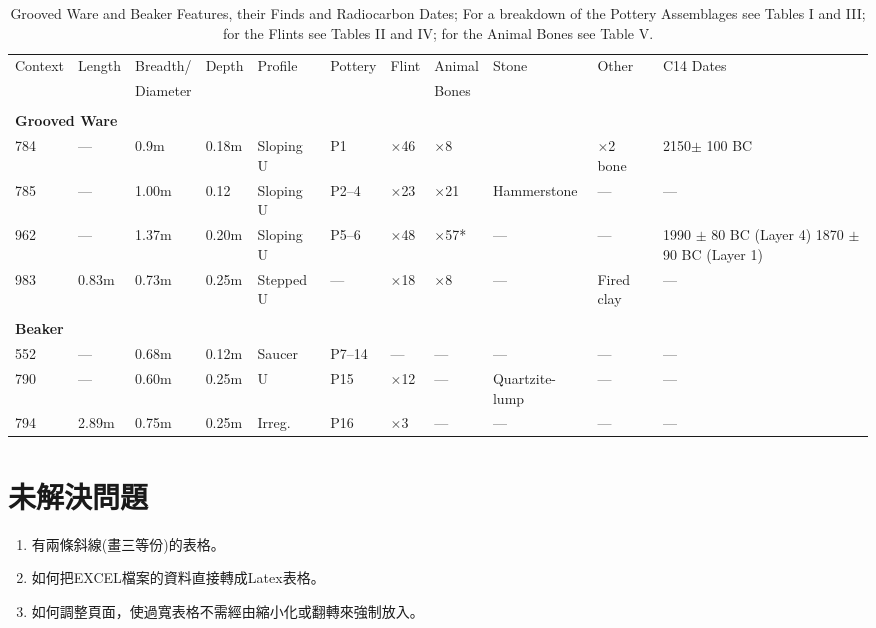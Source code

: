 \documentclass[12pt,a4paper]{report}
\begin{document}
\begin{CJK}{UTF8}{bkai}
\begin{sidewaystable}
\centering
\caption[Grooved Ware and Beaker Features, their Finds and
Radiocarbon Dates]{Grooved Ware and Beaker Features, their
Finds and Radiocarbon Dates; For a breakdown of the Pottery
Assemblages see Tables I and III; for
the Flints see Tables II and IV; for the
Animal Bones see Table V.}
\begin{tabular}{llllllllp{1in}lp{1in}}
\toprule
Context   &Length   &Breadth/   &Depth   &Profile   &Pottery   &Flint   &Animal   &Stone   &Other    &C14 Dates \\
  &         &Diameter   &        &          &          &        & 
Bones&&&\\
\midrule
&&&&&&&&&&\\
\multicolumn{10}{l}{\bf Grooved Ware}&\\
784       &---        &0.9m       &0.18m   &Sloping U &P1       &$\times$46  &  $\times$8      &&       $\times$2 bone&  2150$\pm$ 100 BC\\
785       &---        &1.00m      &0.12    &Sloping U &P2--4    &$\times$23  &  $\times$21     & Hammerstone &---&---\\
962       &---        &1.37m      &0.20m   &Sloping U &P5--6    &$\times$48  &  $\times$57*    & ---&     ---&1990 $\pm$ 80 BC (Layer 4) 1870 $\pm$90 BC (Layer 1)\\
983       &0.83m      &0.73m      &0.25m   &Stepped U &---      &$\times$18  &  $\times$8      & ---& Fired clay&---\\
&&&&&&&&&&\\
\multicolumn{10}{l}{\bf Beaker}&\\
552       &---        &0.68m      &0.12m   &Saucer    &P7--14   &---           & ---       & ---       &---        &---\\
790       &---        &0.60m      &0.25m   &U         &P15      &$\times$12    & ---       & Quartzite-lump&---    &---\\
794       &2.89m      &0.75m      &0.25m   &Irreg.    &P16      &$\times$3     & ---       & ---       &---        &---\\
\bottomrule
\end{tabular}
\end{sidewaystable}

\chapter{未解決問題}

\begin{enumerate}
	\item 有兩條斜線(畫三等份)的表格。
	\item 如何把EXCEL檔案的資料直接轉成Latex表格。
	\item 如何調整頁面，使過寬表格不需經由縮小化或翻轉來強制放入。
\end{enumerate}


\end{CJK}
\end{document}
